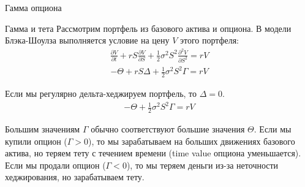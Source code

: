 \documentclass{beamer}
\begin{document}
\begin{frame}{Гамма опциона}
\centering
{}
\end{frame}



\begin{frame}{Гамма и тета}
\justify
Рассмотрим портфель из базового актива и опциона. В модели Блэка-Шоулза выполняется условие на цену $V$ этого портфеля:
\begin{align*}
\frac{\partial V}{\partial t} + rS\frac{\partial V}{\partial S} + \frac{1}{2}\sigma^2S^2\frac{\partial^2 V}{\partial S^2} = rV
\end{align*}
\begin{align*}
-\Theta + rS\Delta + \frac{1}{2}\sigma^2S^2\Gamma = rV
\end{align*}

Если мы регулярно дельта-хеджируем портфель, то $\Delta=0$.
\begin{align*}
-\Theta + \frac{1}{2}\sigma^2S^2\Gamma = rV
\end{align*}

\justify
Большим значениям $\Gamma$ обычно соответствуют большие значения $\Theta$. Если мы купили опцион ($\Gamma > 0$), то мы зарабатываем на больших движениях базового актива, но теряем тету с течением времени (time value опциона уменьшается). Если мы продали опцион ($\Gamma < 0$), то мы теряем деньги из-за неточности хеджирования, но зарабатываем тету.
\end{frame}
\end{document}
